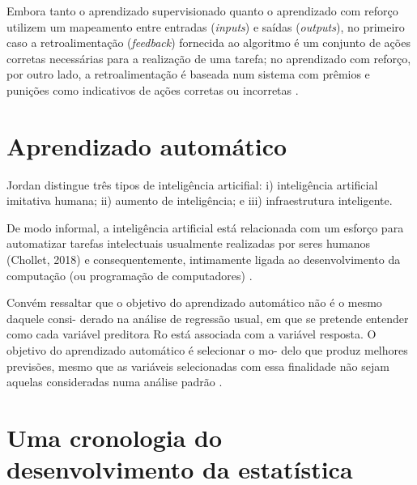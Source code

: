 \documentclass[
]{latex/krantz}
\renewenvironment{quote}{\begin{VF}}{\end{VF}}
\theoremstyle{definition}
\theoremstyle{definition}
\theoremstyle{definition}
\theoremstyle{definition}
\theoremstyle{remark}
\begin{document}
\begin{quote}
Embora tanto o aprendizado supervisionado quanto o aprendizado com reforço utilizem um mapeamento entre entradas (\emph{inputs}) e saídas (\emph{outputs}), no primeiro caso a retroalimentação (\emph{feedback}) fornecida ao algoritmo é um conjunto de ações corretas necessárias para a realização de uma tarefa; no aprendizado com reforço, por outro lado, a retroalimentação é baseada num sistema com prêmios e punições como indicativos de ações corretas ou incorretas \citep[p.~3]{MorettinSinger2022}.
\end{quote}

\hypertarget{aprendizado-automuxe1tico}{%
\section{Aprendizado automático}\label{aprendizado-automuxe1tico}}

Jordan \citep[2019 \emph{apud}][p.~4]{MorettinSinger2022} distingue três tipos de inteligência articifial: i) inteligência artificial imitativa humana; ii) aumento de inteligência; e iii) infraestrutura inteligente.

\begin{quote}
De modo informal, a inteligência artificial está relacionada com um esforço para automatizar tarefas intelectuais usualmente realizadas por seres humanos (Chollet, 2018) e consequentemente, intimamente ligada ao desenvolvimento da computação (ou programação de computadores) \citep[p.~4]{MorettinSinger2022}.
\end{quote}

\begin{quote}
Convém ressaltar que o objetivo do aprendizado automático não é o mesmo daquele consi- derado na análise de regressão usual, em que se pretende entender como cada variável preditora Ro está associada com a variável resposta. O objetivo do aprendizado automático é selecionar o mo- delo que produz melhores previsões, mesmo que as variáveis selecionadas com essa finalidade não sejam aquelas consideradas numa análise padrão \citep[p.~5]{MorettinSinger2022}.
\end{quote}

\hypertarget{uma-cronologia-do-desenvolvimento-da-estatuxedstica}{%
\section{Uma cronologia do desenvolvimento da estatística}\label{uma-cronologia-do-desenvolvimento-da-estatuxedstica}}
\end{document}
